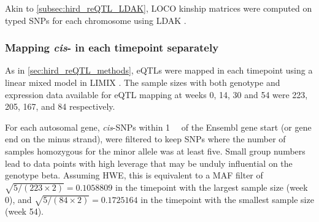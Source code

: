 Akin to \cref{subsec:hird_reQTL_LDAK}, \gls{LOCO} kinship matrices were computed on typed \glspl{SNP} for each chromosome using LDAK \autocite{speed2012ImprovedHeritabilityEstimation}.

\subsubsection{Mapping \textit{cis}- in each timepoint separately}

As in \cref{sec:hird_reQTL_methods},
\glspl{eQTL} were mapped in each timepoint using a linear mixed model in {LIMIX} \autocite{lippert2014LIMIXGeneticAnalysis}.
%
%
The sample sizes with both genotype and expression data available for \gls{eQTL} mapping at weeks 0, 14, 30 and 54 were 223, 205, 167, and 84 respectively.

%
For each autosomal gene, \textit{cis}-\glspl{SNP} within \SI{1}{\mega\bp} of the Ensembl gene start (or gene end on the minus strand),
were filtered to keep \glspl{SNP} where the number of samples homozygous for the minor allele was at least five.
Small group numbers lead to data points with high leverage that may be unduly influential on the genotype beta.
Assuming \gls{HWE}, this is equivalent to a \gls{MAF} filter of 
$\sqrt{5/(223\times2)} = \num{0.1058809}$ in the timepoint with the largest sample size (week 0),
and $\sqrt{5/(84\times2)} = \num{0.1725164}$ in the timepoint with the smallest sample size (week 54).

